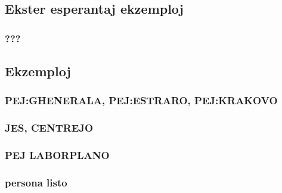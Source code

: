 \documentclass{beamer}
\begin{document}
\subsection{Ekster esperantaj ekzemploj}

  \begin{frame}
    \frametitle{???}

  \end{frame}

\subsection{Ekzemploj}

  \begin{frame}
    \frametitle{PEJ:GHENERALA, PEJ:ESTRARO, PEJ:KRAKOVO}

  \end{frame}


  \begin{frame}
    \frametitle{JES, CENTREJO}

  \end{frame}


  \begin{frame}
    \frametitle{PEJ LABORPLANO}

  \end{frame}


  \begin{frame}
    \frametitle{persona listo}

  \end{frame}

  
\end{document}
